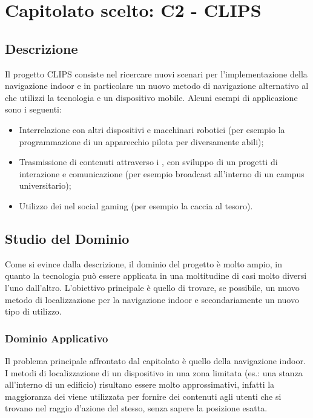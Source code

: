 \section{Capitolato scelto: C2 - CLIPS}

\subsection{Descrizione}

Il progetto CLIPS consiste nel ricercare nuovi scenari per l'implementazione della navigazione indoor e in particolare 
un nuovo metodo di navigazione alternativo al  che utilizzi la tecnologia  e un dispositivo mobile.
Alcuni esempi di applicazione sono i seguenti:
\begin{itemize}
	\item Interrelazione con altri dispositivi e macchinari robotici (per esempio la programmazione di un apparecchio pilota per diversamente abili);
	\item Trasmissione di contenuti attraverso i , con sviluppo di un progetti di interazione e comunicazione (per esempio broadcast all'interno di un campus universitario);
	\item Utilizzo dei  nel social gaming (per esempio la caccia al tesoro).
\end{itemize}

\subsection{Studio del Dominio}

Come si evince dalla descrizione, il dominio del progetto è molto ampio, in quanto la tecnologia  può essere applicata in una moltitudine
di casi molto diversi l'uno dall'altro. L'obiettivo principale è quello di trovare, se possibile, un nuovo metodo di localizzazione per la navigazione indoor e secondariamente
un nuovo tipo di utilizzo.


\subsubsection{Dominio Applicativo}
Il problema principale affrontato dal capitolato è quello della navigazione indoor. I metodi di localizzazione di un dispositivo in una zona limitata (es.: una stanza all'interno di un edificio)
risultano essere molto approssimativi, infatti la maggioranza dei  viene utilizzata per fornire dei contenuti agli utenti che si trovano nel raggio d'azione del  stesso, senza sapere 
la posizione esatta.

